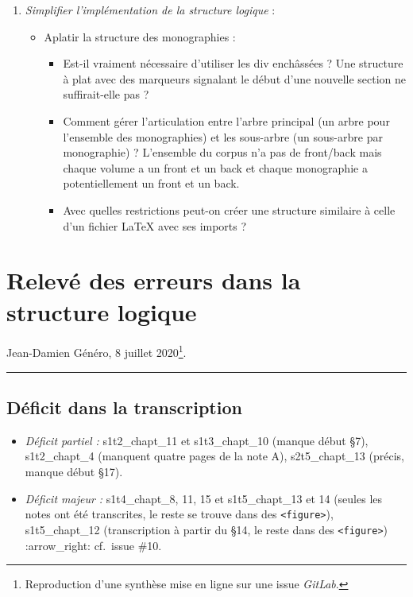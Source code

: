 \begin{enumerate}
    \item \textit{Simplifier l'implémentation de la structure logique} :
    \begin{itemize}
        \item Aplatir la structure des monographies :
        \begin{itemize}
            \item  Est-il vraiment nécessaire d'utiliser les div enchâssées ? Une structure à plat avec des marqueurs signalant le début d'une nouvelle section ne suffirait-elle pas ?
            \item  Comment gérer l'articulation entre l'arbre principal (un arbre pour l'ensemble des monographies) et les sous-arbre (un sous-arbre par monographie) ? L'ensemble du corpus n'a pas de front/back mais chaque volume a un front et un back et chaque monographie a potentiellement un front et un back.
            \item  Avec quelles restrictions peut-on créer une structure similaire à celle d'un fichier \LaTeX{} avec ses imports ?
        \end{itemize}
    \end{itemize}
\end{enumerate}

\section{Relevé des erreurs dans la structure
logique}\label{ann:releve_erreurs}

Jean-Damien Généro, 8 juillet 2020\footnote{Reproduction d'une synthèse mise en ligne sur une issue \textit{GitLab}.}.

\begin{center}\rule{3in}{0.4pt}\end{center}

\subsection{Déficit dans la
transcription}\label{duxe9ficit-dans-la-transcription}

\begin{itemize}
\item
  \emph{Déficit partiel :} s1t2\_chapt\_11 et s1t3\_chapt\_10 (manque
  début §7), s1t2\_chapt\_4 (manquent quatre pages de la note A),
  s2t5\_chapt\_13 (précis, manque début §17).
\item
  \emph{Déficit majeur :} s1t4\_chapt\_8, 11, 15 et s1t5\_chapt\_13 et
  14 (seules les notes ont été transcrites, le reste se trouve dans des
  \texttt{\textless{}figure\textgreater{}}), s1t5\_chapt\_12
  (transcription à partir du §14, le reste dans des
  \texttt{\textless{}figure\textgreater{}}) :arrow\_right: cf.~issue
  \#10.
\end{itemize}

